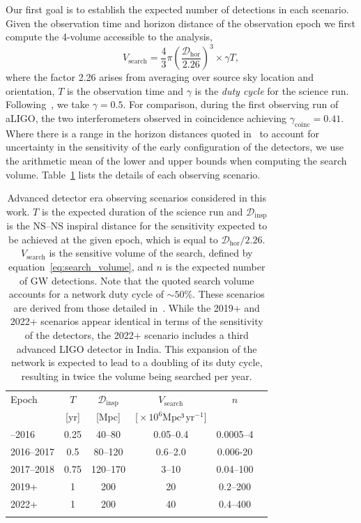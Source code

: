 \documentclass[twocolumn]{aastex61}
\newcommand{\ee}[1]{\ensuremath{\!\times\!10^{#1}}}
\newcommand{\dhor}{\ensuremath{{\mathcal D}_{\mathrm{hor}}}}
\newcommand{\dinsp}{\ensuremath{{\mathcal D}_{\mathrm{insp}}}}
\newcommand{\mpc}{\mathrm{Mpc}}
\newcommand{\yr}{\mathrm{yr}}
\newcommand{\BNS}{\ac{NS}--\ac{NS}\xspace}
\begin{document}
Our first goal is to establish the expected number of detections in
each scenario.  Given the observation time and horizon distance of the
observation epoch we first compute the 4-volume accessible to the
analysis,
%
\begin{equation}
    \label{eq:search_volume}
    V_{\mathrm{search}} = \frac{4}{3}\pi \left(\frac{\dhor}{2.26}\right)^3 \times \gamma T,
\end{equation}
%
where the factor 2.26 arises from averaging over source sky location
and orientation, $T$ is the observation time and $\gamma$ is the
\emph{duty cycle} for the science run.  Following~\cite{Aasi:2013wya},
we take $\gamma=0.5$.  For comparison, during the first observing run
of \ac{aLIGO}, the two interferometers observed in coincidence
achieving $\gamma_{\mathrm{coinc}} = 0.41$.  Where there is a range in
the horizon distances quoted in~\cite{Aasi:2013wya} to account for
uncertainty in the sensitivity of the early configuration of the
detectors, we use the arithmetic mean of the lower and upper bounds
when computing the search volume.  Table~\ref{tab:scenarios} lists
the details of each observing scenario.
%
\begin{table}
\centering
\begin{tabular}{lccccc}
  \toprule
  Epoch &  $T$ & \dinsp & $V_{\mathrm{search}}$ & $n$ \\
        &   [yr] & [Mpc] & [$\ee{6} \mpc³\,\yr^{-1}$] &  \\
  \colrule
  2015--2016 & 0.25 & 40--80   & 0.05--0.4 & 0.0005--4 \\
  2016--2017 & 0.5 & 80--120 & 0.6--2.0 & 0.006-20\\
  2017--2018 & 0.75 & 120--170 & 3--10 & 0.04--100\\
  2019+      & 1    & 200 & 20 & 0.2--200 \\
  2022+      & 1    & 200 & 40 & 0.4--400 \\
  \botrule
\end{tabular}
\caption{Advanced detector era observing scenarios considered in this
  work.  $T$ is the expected duration of the science run and $\dinsp$
  is the \BNS inspiral distance for the sensitivity expected to be
  achieved at the given epoch, which is equal to $\dhor / 2.26$.
  $V_{\mathrm{search}}$ is the sensitive volume of the search, defined
  by equation~\ref{eq:search_volume}, and $n$ is the expected number
  of \ac{GW} detections.  Note that the quoted search volume accounts
  for a network duty cycle of $\sim 50\%$.  These scenarios are
  derived from those detailed in~\cite{Aasi:2013wya}. While the 2019+ and 2022+
  scenarios appear identical in terms of the sensitivity of the detectors, the
  2022+ scenario includes a third advanced LIGO detector in India. This
  expansion of the network is expected to lead to a doubling of its duty cycle,
  resulting in twice the volume being searched per year.
  \label{tab:scenarios}}
\end{table}
%
\end{document}
